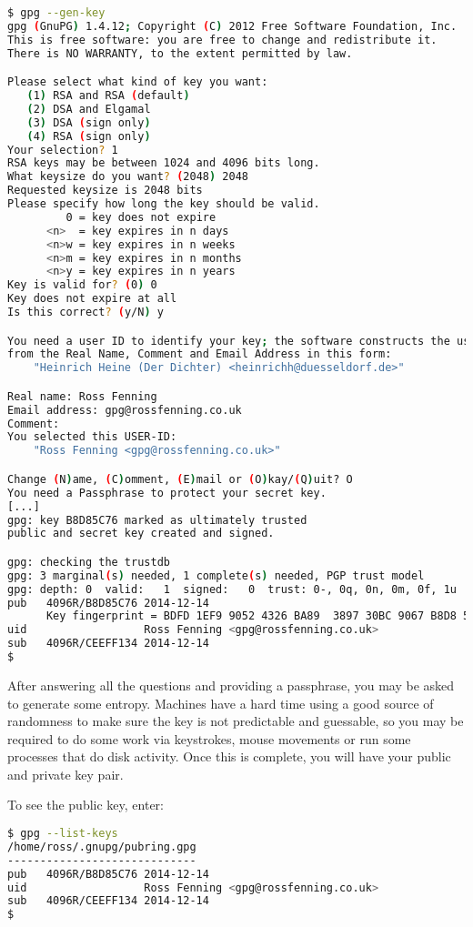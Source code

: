 \documentclass{report}
\begin{document}
\begin{lstlisting}[language=bash]
$ gpg --gen-key
gpg (GnuPG) 1.4.12; Copyright (C) 2012 Free Software Foundation, Inc.
This is free software: you are free to change and redistribute it.
There is NO WARRANTY, to the extent permitted by law.

Please select what kind of key you want:
   (1) RSA and RSA (default)
   (2) DSA and Elgamal
   (3) DSA (sign only)
   (4) RSA (sign only)
Your selection? 1
RSA keys may be between 1024 and 4096 bits long.
What keysize do you want? (2048) 2048
Requested keysize is 2048 bits
Please specify how long the key should be valid.
         0 = key does not expire
      <n>  = key expires in n days
      <n>w = key expires in n weeks
      <n>m = key expires in n months
      <n>y = key expires in n years
Key is valid for? (0) 0
Key does not expire at all
Is this correct? (y/N) y

You need a user ID to identify your key; the software constructs the user ID
from the Real Name, Comment and Email Address in this form:
    "Heinrich Heine (Der Dichter) <heinrichh@duesseldorf.de>"

Real name: Ross Fenning
Email address: gpg@rossfenning.co.uk
Comment:
You selected this USER-ID:
    "Ross Fenning <gpg@rossfenning.co.uk>"

Change (N)ame, (C)omment, (E)mail or (O)kay/(Q)uit? O
You need a Passphrase to protect your secret key.
[...]
gpg: key B8D85C76 marked as ultimately trusted
public and secret key created and signed.

gpg: checking the trustdb
gpg: 3 marginal(s) needed, 1 complete(s) needed, PGP trust model
gpg: depth: 0  valid:   1  signed:   0  trust: 0-, 0q, 0n, 0m, 0f, 1u
pub   4096R/B8D85C76 2014-12-14
      Key fingerprint = BDFD 1EF9 9052 4326 BA89  3897 30BC 9067 B8D8 5C76
uid                  Ross Fenning <gpg@rossfenning.co.uk>
sub   4096R/CEEFF134 2014-12-14
$
\end{lstlisting}

After answering all the questions and providing a passphrase,
you may be asked to generate some entropy.
Machines have a hard time using a good source of randomness to make sure
the key is not predictable and guessable, so you may be required to do
some work via keystrokes, mouse movements or run some processes that
do disk activity. Once this is complete, you will have your public and
private key pair.

To see the public key, enter:

\begin{lstlisting}[language=bash]
$ gpg --list-keys
/home/ross/.gnupg/pubring.gpg
-----------------------------
pub   4096R/B8D85C76 2014-12-14
uid                  Ross Fenning <gpg@rossfenning.co.uk>
sub   4096R/CEEFF134 2014-12-14
$
\end{lstlisting}
\end{document}

